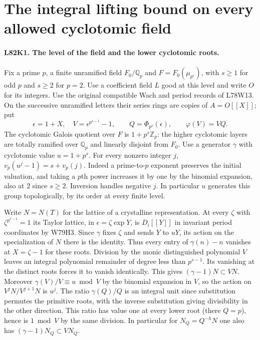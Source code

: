 \section{The integral lifting bound on every allowed cyclotomic field}

\paragraph{L82K1. The level of the field and the lower cyclotomic roots.}
Fix a prime $p$, a finite unramified field $F_0/\mathbb Q_p$
and $F=F_0(\mu_{p^s})$, with $s\ge1$ for odd $p$ and $s\ge2$
for $p=2$. Use a coefficient field $L$ good at this level and
write $O$ for its integers. Use the original compatible Wach and
period records of L78W13. On the successive unramified letters
their series rings are copies of $A=O[[X]]$; put
\[
  \epsilon=1+X,\quad V=\epsilon^{p^{s-1}}-1,\qquad
  Q=\Phi_{p^s}(\epsilon),\qquad \varphi(V)=VQ .
\]
The cyclotomic Galois quotient over $F$ is $1+p^s\mathbb Z_p$:
the higher cyclotomic layers are totally ramified over $\mathbb Q_p$
and linearly disjoint from $F_0$. Use a generator $\gamma$
with cyclotomic value $u=1+p^s$. For every nonzero integer $j$,
$v_p(u^j-1)=s+v_p(j)$. Indeed a prime-to-$p$ exponent preserves
the initial valuation, and taking a $p$th power increases it by
one by the binomial expansion, also at $2$ since $s\ge2$.
Inversion handles negative $j$. In particular $u$ generates this
group topologically, by its order at every finite level.

Write $N=N(T)$ for the lattice of a crystalline representation.
At every $\zeta$ with $\zeta^{p^{s-1}}=1$ its Taylor lattice,
in $\epsilon=\zeta\exp Y$, is $D_i[[Y]]$ in invariant period
coordinates by W79H3. Since $\gamma$ fixes $\zeta$ and sends
$Y$ to $uY$, its action on the specialization of $N$ there is
the identity. Thus every entry of $\gamma(n)-n$ vanishes at
$X=\zeta-1$ for these roots. Division by the monic distinguished
polynomial $V$ leaves an integral polynomial remainder of degree
less than $p^{s-1}$. Its vanishing at the distinct roots forces
it to vanish identically. This gives $(\gamma-1)N\subset VN$.
Moreover $\gamma(V)/V\equiv u\bmod V$ by the binomial
expansion in $V$, so the action on $V^jN/V^{j+1}N$ is $u^j$.
The ratio $\gamma(Q)/Q$ is an integral unit since substitution
permutes the primitive roots, with the inverse substitution
giving divisibility in the other direction. This ratio has value
one at every lower root (there $Q=p$), hence is $1\bmod V$
by the same division. In particular for $N_Q=Q^{-h}N$ one
also has $(\gamma-1)N_Q\subset VN_Q$.

